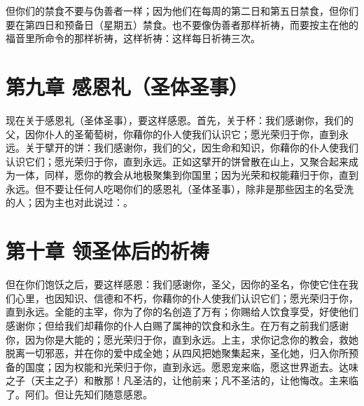 但你们的禁食不要与伪善者一样；因为他们在每周的第二日和第五日禁食，但你们要在第四日和预备日（星期五）禁食。也不要像伪善者那样祈祷，而要按主在他的福音里所命令的那样祈祷，这样祈祷：这样每日祈祷三次。\par


\section{第九章 感恩礼（圣体圣事）}

现在关于感恩礼（圣体圣事），要这样感恩。首先，关于杯：我们感谢你，我们的父，因你仆人的圣葡萄树，你藉你的仆人使我们认识它；愿光荣归于你，直到永远。关于擘开的饼：我们感谢你，我们的父，因生命和知识，你藉你的仆人使我们认识它们；愿光荣归于你，直到永远。正如这擘开的饼曾散在山上，又聚合起来成为一体，同样，愿你的教会从地极聚集到你国里；因为光荣和权能藉归于你，直到永远。但不要让任何人吃喝你们的感恩礼（圣体圣事），除非是那些因主的名受洗的人；因为主也对此说过：。\par


\section{第十章 领圣体后的祈祷}

但在你们饱饫之后，要这样感恩：我们感谢你，圣父，因你的圣名，你使它住在我们心里，也因知识、信德和不朽，你藉你的仆人使我们认识它们；愿光荣归于你，直到永远。全能的主宰，你为了你的名创造了万有；你赐给人饮食享受，好使他们感谢你；但给我们却藉你的仆人白赐了属神的饮食和永生。在万有之前我们感谢你，因为你是大能的；愿光荣归于你，直到永远。上主，求你记念你的教会，救她脱离一切邪恶，并在你的爱中成全她；从四风把她聚集起来，圣化她，归入你所预备的国度；因为权能和光荣归于你，直到永远。愿恩宠来临，愿这世界逝去。达味之子（天主之子）和散那！凡圣洁的，让他前来；凡不圣洁的，让他悔改。主来临了。阿们。但让先知们随意感恩。\par

